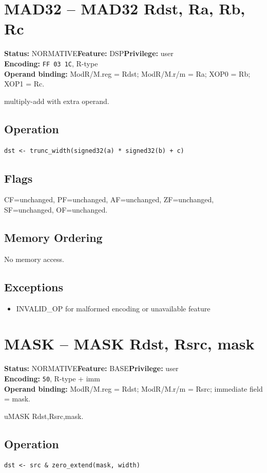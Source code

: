 \documentclass[10pt]{article}
\begin{document}
\section{MAD32 -- MAD32 Rdst, Ra, Rb, Rc}
\textbf{Status:} NORMATIVE\quad \textbf{Feature:} DSP\quad \textbf{Privilege:} user\\
\textbf{Encoding:} \texttt{FF 03 1C}, R-type\\
\textbf{Operand binding:} ModR/M.reg = Rdst; ModR/M.r/m = Ra; XOP0 = Rb; XOP1 = Rc.

multiply-add with extra operand.

\subsection*{Operation}
\begin{lstlisting}
dst <- trunc_width(signed32(a) * signed32(b) + c)
\end{lstlisting}
\subsection*{Flags}
CF=unchanged, PF=unchanged, AF=unchanged, ZF=unchanged, SF=unchanged, OF=unchanged.
\subsection*{Memory Ordering}
No memory access.
\subsection*{Exceptions}
\begin{itemize}
\item INVALID\_OP for malformed encoding or unavailable feature
\end{itemize}
\clearpage

\section{MASK -- MASK Rdst, Rsrc, mask}
\textbf{Status:} NORMATIVE\quad \textbf{Feature:} BASE\quad \textbf{Privilege:} user\\
\textbf{Encoding:} \texttt{50}, R-type + imm\\
\textbf{Operand binding:} ModR/M.reg = Rdst; ModR/M.r/m = Rsrc; immediate field = mask.

uMASK Rdst,Rsrc,mask.

\subsection*{Operation}
\begin{lstlisting}
dst <- src & zero_extend(mask, width)
\end{lstlisting}
\end{document}
